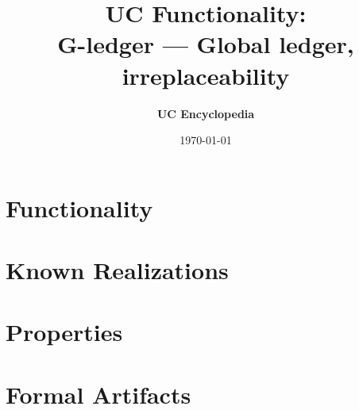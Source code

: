 \documentclass[11pt,a4paper]{article}
\title{\textbf{\Large UC Functionality:}\\[0.2em] \Large G-ledger --- Global ledger, irreplaceability}
\author{\textbf{UC Encyclopedia}}
\date{\today}
\newtheorem{functionality}{Functionality}
\begin{document}
\maketitle

\begin{abstract}
\end{abstract}

\section{Functionality}

%

\section{Known Realizations}


\section{Properties}


\section{Formal Artifacts}

\end{document}
